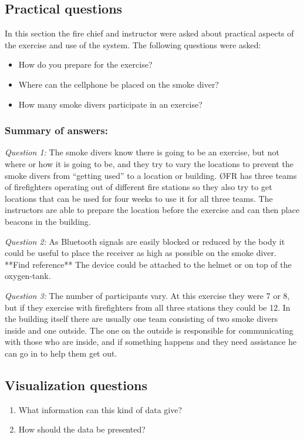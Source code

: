 \documentclass[../Main/thesis.tex]{subfiles}
\begin{document}
\subsection{Practical questions}
In this section the fire chief and instructor were asked about practical aspects of the exercise and use of the system.
The following questions were asked:
\begin{itemize}
	\item How do you prepare for the exercise?
	\item Where can the cellphone be placed on the smoke diver?
	\item How many smoke divers participate in an exercise?
\end{itemize}

\subsubsection*{Summary of answers:}
\textit{Question 1:} 
The smoke divers know there is going to be an exercise, but not where or how it is going to be, and they try to vary the locations to prevent the smoke divers from ``getting used'' to a location or building.
ØFR has three teams of firefighters operating out of different fire stations so they also try to get locations that can be used for four weeks to use it for all three teams.
The instructors are able to prepare the location before the exercise and can then place beacons in the building.

\textit{Question 2:} 
As Bluetooth signals are easily blocked or reduced by the body it could be useful to place the receiver as high as possible on the smoke diver. **Find reference**
The device could be attached to the helmet or on top of the oxygen-tank.

\textit{Question 3:} 
The number of participants vary.
At this exercise they were 7 or 8, but if they exercise with firefighters from all three stations they could be 12.
In the building itself there are usually one team consisting of two smoke divers inside and one outside.
The one on the outside is responsible for communicating with those who are inside, and if something happens and they need assistance he can go in to help them get out.

\subsection{Visualization questions}
\begin{enumerate}
	\item What information can this kind of data give?
	\item How should the data be presented?
\end{enumerate}
\end{document}
